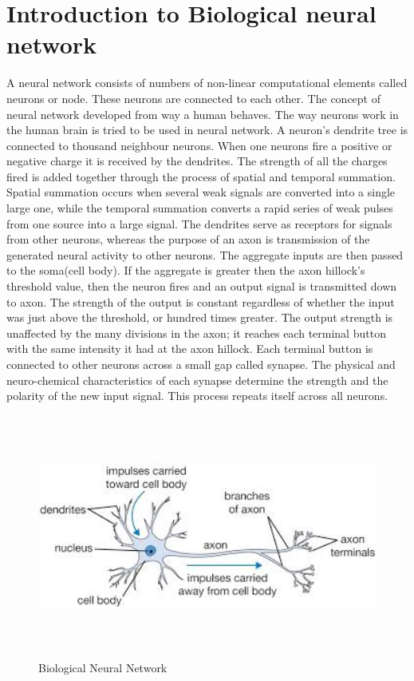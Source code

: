 \section{Introduction to Biological neural network}
A neural network consists of numbers of non-linear computational elements called neurons or node. These neurons are connected to each other. The concept of neural network developed from way a human behaves. The way neurons work in the human brain is tried to be used in neural network. A neuron's dendrite tree is connected to thousand neighbour neurons. When one neurons fire a positive or negative charge it is received by the dendrites. The strength of all the charges fired is added together through the process of spatial and temporal summation. Spatial summation occurs when several weak signals are converted into a single large one, while the temporal summation converts a rapid series of weak pulses from one source into a large signal. \newline
The dendrites serve as receptors for signals from other neurons, whereas the purpose of an axon is transmission of the generated neural activity to other neurons. The aggregate inputs are then passed to the soma(cell body). If the aggregate is greater then the axon hillock's threshold value, then the neuron fires and an output signal is transmitted down to axon. The strength of the output is constant regardless of whether the input was just above the threshold, or hundred times greater. The output strength is unaffected by the many divisions in the axon; it reaches each terminal button with the same intensity it had at the axon hillock. \newline
Each terminal button is connected to other neurons across a small gap called synapse. The physical and neuro-chemical characteristics of each synapse determine the strength and the polarity of the new input signal. This process repeats itself across all neurons.

 \begin{figure}[h]
   \includegraphics[width=130mm,height=80mm]{images/bio.jpg}
   \caption{Biological Neural Network}
        
   \end{figure}

